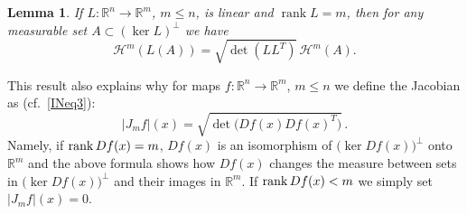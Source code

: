 \documentclass[12pt,leqno]{amsart}
\newtheorem{lemma}[theorem]{Lemma}
\theoremstyle{definition}
\newcommand{\bbbr}{\mathbb R}
\def\rank{{\rm rank\,}}
\numberwithin{theorem}{section} \numberwithin{equation}{section}
\begin{document}
\begin{lemma}
If $L:\mathbb{R}^{n}\to\mathbb{R}^{m}$, $m\leq n$, is linear and
$\operatorname{rank} L=m$, then for any measurable set
$A\subset(\ker L)^{\perp}$ we have
$$
\mathcal{H}^{m}(L(A))
=
\sqrt{\det(LL^{T})}\,\mathcal{H}^{m}(A).
$$
\end{lemma}

This result also explains why for maps $f:\bbbr^n\to\bbbr^m$, $m\leq n$ we define the Jacobian
as (cf.\ \eqref{INeq3}):
$$
|J_mf|(x)=\sqrt{\det \big(Df(x)Df(x)^T\big)}\, .
$$
Namely, if $\rank Df(x)=m$, $Df(x)$ is an isomorphism of $\big(\ker Df(x)\big)^\perp$ onto $\bbbr^m$ and the above formula shows how $Df(x)$ changes the measure between sets in $\big(\ker Df(x)\big)^\perp$ and their images in $\bbbr^m$.
If $\rank Df(x)<m$ we simply set $|J_mf|(x)=0$.
\end{document}

